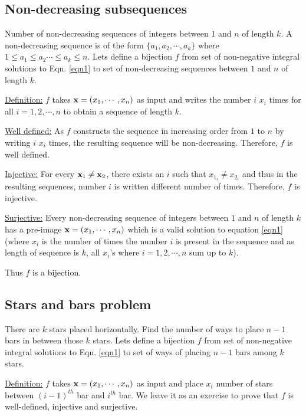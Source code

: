 \subsection*{Non-decreasing subsequences}\label{non-dec-subseq-prob} Number of non-decreasing sequences of integers between $1$ and $n$ of length $k$. A non-decreasing sequence is of the form $\{a_1,a_2,\cdots,a_k\}$ where $1\leq a_1\leq a_2\cdots\leq a_k\leq n$. Lets define a bijection $f$ from set of non-negative integral solutions to Eqn. \ref{eqn1} to set of non-decreasing sequences between $1$ and $n$ of length $k$. 
\begin{description}
\item\underline{Definition:} $f$ takes $\mathbf{x}=(x_1,\cdots,x_n)$ as input and writes the number $i$ $x_i$ times for all $i=1,2,\cdots,n$ to obtain a sequence of length $k$.
\item\underline{Well defined:} As $f$ constructs the sequence in increasing order from $1$ to $n$ by writing $i$ $x_i$ times, the resulting sequence will be non-decreasing. Therefore, $f$ is well defined.
\item\underline{Injective:} For every $\mathbf{x}_1\neq\mathbf{x}_2$, there exists an $i$ such that $x_{1_i} \neq x_{2_i}$ and thus in the resulting sequences, number $i$ is written different number of times. Therefore, $f$ is injective.
\item\underline{Surjective:} Every non-decreasing sequence of integers between $1$ and $n$ of length $k$ has a pre-image $\mathbf{x}=(x_1,\cdots,x_n)$  which is a valid solution to equation \ref{eqn1} (where $x_i$ is the number of times the number $i$ is present in the sequence and as length of sequence is $k$, all $x_i$'s where $i=1,2,\cdots,n$ sum up to $k$).
\end{description}
Thus $f$ is a bijection.
\subsection*{Stars and bars problem}\label{star-bar-prob} There are $k$ stars placed horizontally. Find the number of ways to place $n-1$ bars in between those $k$ stars. Lets define a bijection $f$ from set of non-negative integral solutions to Eqn. \ref{eqn1} to set of ways of placing $n-1$ bars among $k$ stars.
\begin{description}
\item\underline{Definition:} $f$ takes $\mathbf{x}=(x_1,\cdots,x_n)$ as input and place $x_i$ number of stars between $(i-1)^{th}$ bar and $i^{th}$ bar. We leave it as an exercise to prove that $f$ is well-defined, injective and surjective.
\end{description}

